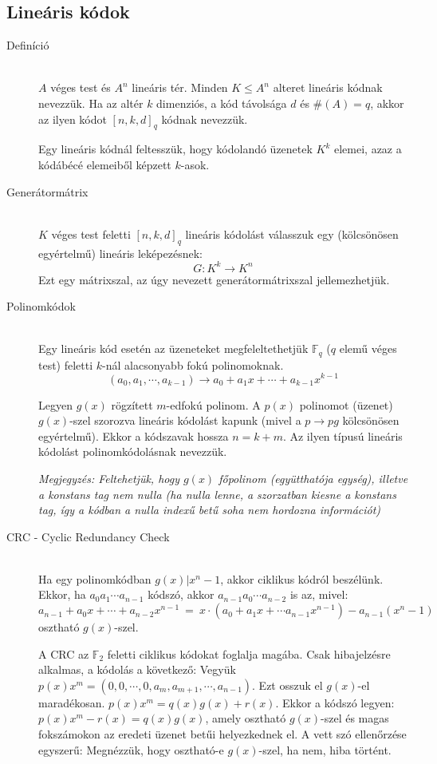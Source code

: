 \documentclass[margin=0px]{article}
\begin{document}
\subsection{Lineáris kódok}
\begin{description}
    \item[Definíció] \hfill \\
        $A$ véges test és $A^n$ lineáris tér. Minden $ K \leq A^n$ alteret lineáris kódnak nevezzük. Ha az altér $k$ dimenziós, a kód távolsága $d$ és $\#(A) = q$, akkor az ilyen kódot $[n,k,d]_q$ kódnak nevezzük.

        Egy lineáris kódnál feltesszük, hogy kódolandó üzenetek $K^k$ elemei, azaz a kódábécé elemeiből képzett $k$-asok.
    \item[Generátormátrix] \hfill \\
        $K$ véges test feletti $[n,k,d]_q$ lineáris kódolást válasszuk egy (kölcsönösen egyértelmű) lineáris leképezésnek:
        \[ G:K^k \rightarrow K^n \]
        Ezt egy mátrixszal, az úgy nevezett generátormátrixszal jellemezhetjük.
    \item[Polinomkódok] \hfill \\
        Egy lineáris kód esetén az üzeneteket megfeleltethetjük $\mathbb{F}_q$ ($q$ elemű véges test) feletti $k$-nál alacsonyabb fokú polinomoknak.
        \[(a_0,a_1,\cdots,a_{k-1}) \rightarrow a_0+a_1x+\cdots+a_{k-1}x^{k-1} \]

        Legyen $g(x)$ rögzített $m$-edfokú polinom. A $p(x)$ polinomot (üzenet) $g(x)$-szel szorozva lineáris kódolást kapunk (mivel a $p \rightarrow pg$ kölcsönösen egyértelmű). Ekkor a kódszavak hossza $n=k+m$. Az ilyen típusú lineáris kódolást polinomkódolásnak nevezzük.

        \textit{Megjegyzés: Feltehetjük, hogy $g(x)$ főpolinom (együtthatója egység), illetve a konstans tag nem nulla (ha nulla lenne, a szorzatban kiesne a konstans tag, így a kódban a nulla indexű betű soha nem hordozna információt)}
    \item[CRC - Cyclic Redundancy Check] \hfill \\
        Ha egy polinomkódban $g(x) | x^n-1$, akkor ciklikus kódról beszélünk. Ekkor, ha $a_0a_1\cdots a_{n-1}$ kódszó, akkor $a_{n-1}a_0\cdots a_{n-2}$ is az, mivel:
        \[ a_{n-1}+a_0x+\cdots+a_{n-2}x^{n-1} \ = \ x\cdot(a_0+a_1x+\cdots a_{n-1}x^{n-1})-a_{n-1}(x^n-1) \]
        osztható $g(x)$-szel.

        A CRC az $\mathbb{F}_2$ feletti ciklikus kódokat foglalja magába. Csak hibajelzésre alkalmas, a kódolás a következő: Vegyük $p(x)x^m = (0,0,\cdots,0,a_m,a_{m+1},\cdots,a_{n-1})$. Ezt osszuk el $g(x)$-el maradékosan. $p(x)x^m = q(x)g(x)+r(x)$. Ekkor a kódszó legyen: $p(x)x^m-r(x) = q(x)g(x)$, amely osztható $g(x)$-szel és magas fokszámokon az eredeti üzenet betűi helyezkednek el. A vett szó ellenőrzése egyszerű: Megnézzük, hogy osztható-e $g(x)$-szel, ha nem, hiba történt.
\end{description}
\end{document}
